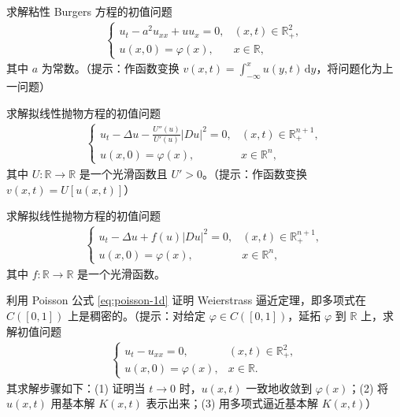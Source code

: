 \documentclass[../../main.tex]{subfiles}%
\begin{document}
\begin{example}
求解粘性 Burgers 方程的初值问题
\begin{align*}
\begin{cases}
u_t-a^2u_{xx}+uu_x=0, & (x,t)\in\mathbb{R}_+^2,\\
u(x,0)=\varphi(x), & x\in\mathbb{R},
\end{cases}
\end{align*}
其中 $a$ 为常数。（提示：作函数变换 $v(x,t)=\int_{-\infty}^x u(y,t)\,\mathrm{d}y$，将问题化为上一问题）
\end{example}

\begin{example}
求解拟线性抛物方程的初值问题
\begin{align*}
\begin{cases}
u_t-\Delta u-\frac{U''(u)}{U'(u)}|Du|^2=0, & (x,t)\in\mathbb{R}_+^{n+1},\\
u(x,0)=\varphi(x), & x\in\mathbb{R}^n,
\end{cases}
\end{align*}
其中 $U:\mathbb{R}\to\mathbb{R}$ 是一个光滑函数且 $U'>0$。（提示：作函数变换 $v(x,t)=U[u(x,t)]$）
\end{example}

\begin{example}
求解拟线性抛物方程的初值问题
\begin{align*}
\begin{cases}
u_t-\Delta u+f(u)|Du|^2=0, & (x,t)\in\mathbb{R}_+^{n+1},\\
u(x,0)=\varphi(x), & x\in\mathbb{R}^n,
\end{cases}
\end{align*}
其中 $f:\mathbb{R}\to\mathbb{R}$ 是一个光滑函数。
\end{example}

\begin{example}
利用 Poisson 公式 \eqref{eq:poisson-1d} 证明 Weierstrass 逼近定理，即多项式在 $C([0,1])$ 上是稠密的。（提示：对给定 $\varphi\in C([0,1])$，延拓 $\varphi$ 到 $\mathbb{R}$ 上，求解初值问题
\begin{align*}
\begin{cases}
u_t-u_{xx}=0, & (x,t)\in\mathbb{R}_+^2,\\
u(x,0)=\varphi(x), & x\in\mathbb{R}.
\end{cases}
\end{align*}
其求解步骤如下：(1) 证明当 $t\to 0$ 时，$u(x,t)$ 一致地收敛到 $\varphi(x)$；(2) 将 $u(x,t)$ 用基本解 $K(x,t)$ 表示出来；(3) 用多项式逼近基本解 $K(x,t)$）
\end{example}
\end{document}
